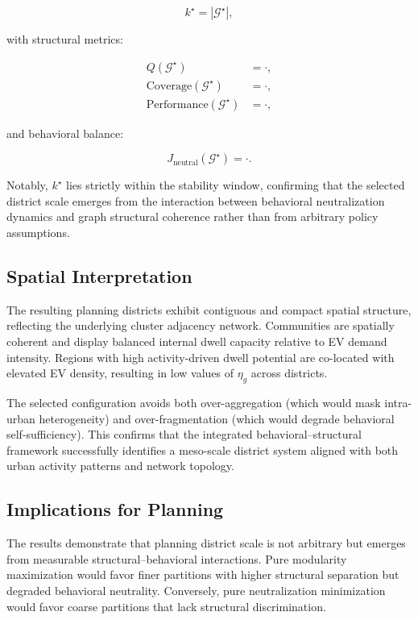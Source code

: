 \documentclass[conference]{IEEEtran}
\begin{document}
\begin{equation}
k^\star = |\mathcal{G}^\star|,
\end{equation}

with structural metrics:

\begin{align}
Q(\mathcal{G}^\star) &= \cdot, \\
\mathrm{Coverage}(\mathcal{G}^\star) &= \cdot, \\
\mathrm{Performance}(\mathcal{G}^\star) &= \cdot,
\end{align}

and behavioral balance:

\begin{equation}
J_{\text{neutral}}(\mathcal{G}^\star) = \cdot.
\end{equation}

Notably, $k^\star$ lies strictly within the stability window, confirming 
that the selected district scale emerges from the interaction between 
behavioral neutralization dynamics and graph structural coherence rather 
than from arbitrary policy assumptions.

\subsection{Spatial Interpretation}

The resulting planning districts exhibit contiguous and compact spatial 
structure, reflecting the underlying cluster adjacency network. 
Communities are spatially coherent and display balanced internal dwell 
capacity relative to EV demand intensity. Regions with high 
activity-driven dwell potential are co-located with elevated EV density, 
resulting in low values of $\eta_g$ across districts.

The selected configuration avoids both over-aggregation (which would mask 
intra-urban heterogeneity) and over-fragmentation (which would degrade 
behavioral self-sufficiency). This confirms that the integrated 
behavioral–structural framework successfully identifies a meso-scale 
district system aligned with both urban activity patterns and network 
topology.

\subsection{Implications for Planning}

The results demonstrate that planning district scale is not arbitrary but 
emerges from measurable structural–behavioral interactions. 
Pure modularity maximization would favor finer partitions with higher 
structural separation but degraded behavioral neutrality. Conversely, 
pure neutralization minimization would favor coarse partitions that lack 
structural discrimination. 
\end{document}
